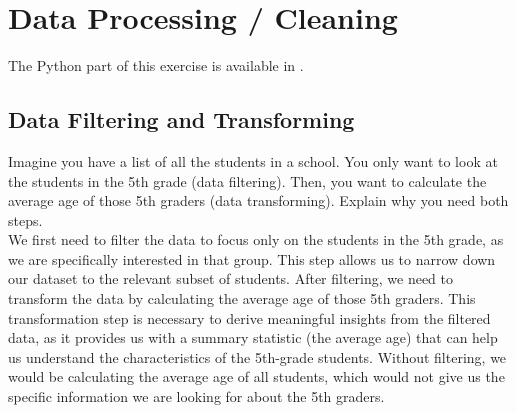 \section{Data Processing / Cleaning}

The Python part of this exercise is available in .

\subsection*{Data Filtering and Transforming}

\begin{ejercicio}
    Imagine you have a list of all the students in a school. You only want to look at the students in the 5th grade (data filtering). Then, you want to calculate the average age of those 5th graders (data transforming). Explain why you need both steps.\\

    We first need to filter the data to focus only on the students in the 5th grade, as we are specifically interested in that group. This step allows us to narrow down our dataset to the relevant subset of students. After filtering, we need to transform the data by calculating the average age of those 5th graders. This transformation step is necessary to derive meaningful insights from the filtered data, as it provides us with a summary statistic (the average age) that can help us understand the characteristics of the 5th-grade students. Without filtering, we would be calculating the average age of all students, which would not give us the specific information we are looking for about the 5th graders.
\end{ejercicio}


